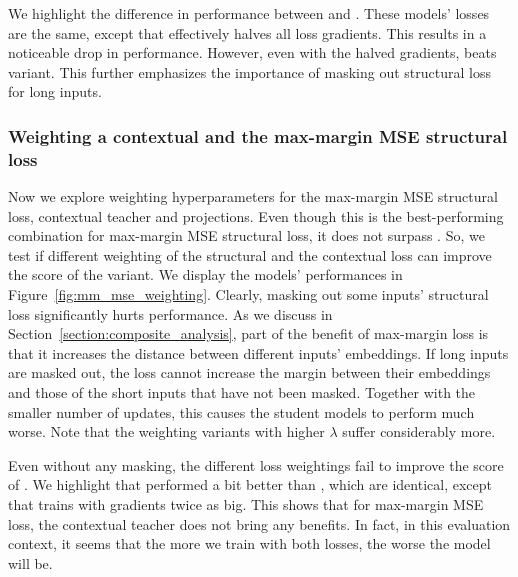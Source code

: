 We highlight the difference in performance between 
and . These models' losses are the same, except that
 effectively halves all loss gradients. This results
in a noticeable drop in performance. However, even with the halved gradients,  beats  variant. This
further emphasizes the importance of masking out structural loss for long
inputs.

\subsubsection{Weighting a contextual and the max-margin MSE structural
loss}

Now we explore weighting hyperparameters for the max-margin MSE structural
loss,  contextual teacher and
 projections. Even though this is the best-performing combination for max-margin MSE structural loss, it does not
surpass . So, we test if different weighting of
the structural and the contextual loss can improve the score of the
 variant. We display the models' performances in
Figure~\ref{fig:mm_mse_weighting}. Clearly, masking out some inputs' structural
loss significantly hurts performance. As we discuss in
Section~\ref{section:composite_analysis}, part of the benefit of max-margin
loss is that it increases the distance between different inputs' embeddings. If
long inputs are masked out, the loss cannot increase the margin between their
embeddings and those of the short inputs that have not been masked.
Together with the smaller number of updates, this causes the student models to
perform much worse. Note that the weighting variants with higher $\lambda$
suffer considerably more.

Even without any masking, the different loss weightings fail to improve the
score of . We highlight that
 performed a bit better than ,
which are identical, except that  trains with
gradients twice as big. This shows that for max-margin MSE loss, the contextual teacher
does not bring any benefits. In fact, in this evaluation context, it seems that
the more we train with both losses, the worse the model will be.

